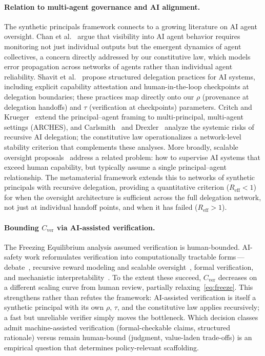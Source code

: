 \documentclass[runningheads]{llncs}
\begin{document}
\paragraph{Relation to multi-agent governance and AI alignment.}
The synthetic principals framework connects to a growing literature on AI agent oversight. Chan et al.~\cite{chan2024visibility} argue that visibility into AI agent behavior requires monitoring not just individual outputs but the emergent dynamics of agent collectives, a concern directly addressed by our constitutive law, which models error propagation across networks of agents rather than individual agent reliability. Shavit et al.~\cite{shavit2023practices} propose structured delegation practices for AI systems, including explicit capability attestation and human-in-the-loop checkpoints at delegation boundaries; these practices map directly onto our $\rho$ (provenance at delegation handoffs) and $\tau$ (verification at checkpoints) parameters. Critch and Krueger~\cite{critchKrueger2020arches} extend the principal--agent framing to multi-principal, multi-agent settings (ARCHES), and Carlsmith~\cite{carlsmith2022powerseeking} and Drexler~\cite{drexler2019cais} analyze the systemic risks of recursive AI delegation; the constitutive law operationalizes a network-level stability criterion that complements these analyses. More broadly, scalable oversight proposals~\cite{christiano2017deep,bowman2022measuring} address a related problem: how to supervise AI systems that exceed human capability, but typically assume a single principal--agent relationship. The metamaterial framework extends this to networks of synthetic principals with recursive delegation, providing a quantitative criterion ($R_{\mathrm{eff}} < 1$) for when the oversight architecture is sufficient across the full delegation network, not just at individual handoff points, and when it has failed ($R_{\mathrm{eff}} > 1$).

\paragraph{Bounding $C_{\mathrm{ver}}$ via AI-assisted verification.}
The Freezing Equilibrium analysis assumed verification is human-bounded. AI-safety work reformulates verification into computationally tractable forms\,---\,debate~\cite{irving2018debate}, recursive reward modeling and scalable oversight~\cite{bowman2022measuring}, formal verification, and mechanistic interpretability~\cite{dafoe2018governance}. To the extent these succeed, $C_{\mathrm{ver}}$ decreases on a different scaling curve from human review, partially relaxing~\eqref{eq:freeze}. This strengthens rather than refutes the framework: AI-assisted verification is itself a synthetic principal with its own $\rho$, $\tau$, and the constitutive law applies recursively; a fast but unreliable verifier simply moves the bottleneck. Which decision classes admit machine-assisted verification (formal-checkable claims, structured rationale) versus remain human-bound (judgment, value-laden trade-offs) is an empirical question that determines policy-relevant scaffolding.
\end{document}

